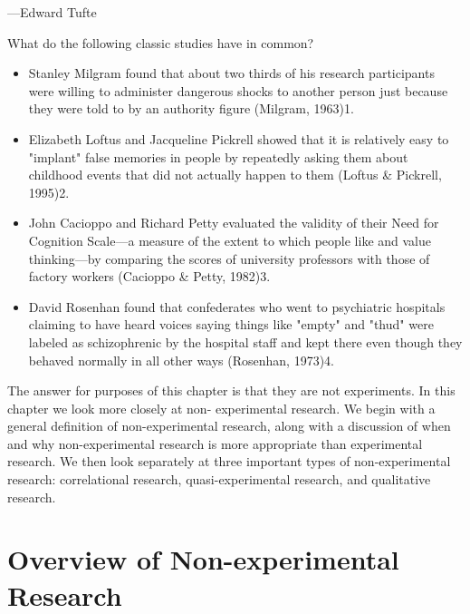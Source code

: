  {---Edward Tufte}

What do the following classic studies have in common?
\begin{itemize}
\item 
Stanley Milgram found that about two thirds of his research participants were willing to administer dangerous shocks to another person just because they were told to by an authority figure (Milgram, 1963)1.
\item Elizabeth Loftus and Jacqueline Pickrell showed that it is relatively easy to "implant" false memories in people by repeatedly asking them about childhood events that did not actually happen to them (Loftus \& Pickrell, 1995)2.
\item John Cacioppo and Richard Petty evaluated the validity of their Need for Cognition Scale---a measure of the extent to which people like and value thinking---by comparing the scores of university professors with those of factory workers (Cacioppo \& Petty, 1982)3.
\item David Rosenhan found that confederates who went to psychiatric hospitals claiming to have heard voices saying things like "empty" and "thud" were labeled as schizophrenic by the hospital staff and kept there even though they behaved normally in all other ways (Rosenhan, 1973)4.
\end{itemize}

The answer for purposes of this chapter is that they are not experiments. In this chapter we look more closely at non- experimental research. We begin with a general definition of non-experimental research, along with a discussion of when and why non-experimental research is more appropriate than experimental research. We then look separately at three important types of non-experimental research: correlational research, quasi-experimental research, and qualitative research.

\section{Overview of Non-experimental Research}


